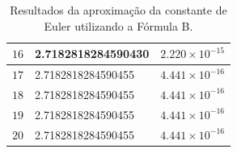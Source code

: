 \documentclass{article}
\begin{document}
\begin{table}[H]
\begin{tabular}{|c|l|l|}
        $16$ & 2.7182818284590430 & $2.220 \times 10^{-15}$ \\ \hline
        $17$ & 2.7182818284590455 & $4.441 \times 10^{-16}$ \\ \hline
        $18$ & 2.7182818284590455 & $4.441 \times 10^{-16}$ \\ \hline
        $19$ & 2.7182818284590455 & $4.441 \times 10^{-16}$ \\ \hline
        $20$ & 2.7182818284590455 & $4.441 \times 10^{-16}$ \\ \hline
    \end{tabular}
    \vspace{0.2cm}
    \caption{Resultados da aproximação da constante de Euler utilizando a Fórmula B.}
    \label{tab:formula_b}
\end{table}
\end{document}
